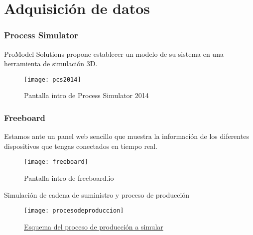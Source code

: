 \documentclass[11pt]{beamer}					%
\begin{document}
\section{Adquisición de datos}
		\begin{frame}
			\frametitle{Process Simulator}			
			\begin{block}{}
				\begin{center}
				ProModel Solutions  propone establecer un modelo de su sistema en una herramienta de simulación 3D.
				\begin{figure}[htb]
		    			\texttt{[image: pcs2014]}
 					\caption{ Pantalla intro de Process Simulator 2014} 
				\end{figure}
				\end{center}
				
			\end{block}
			
	   	\end{frame}
		\begin{frame}
			\frametitle{Freeboard}			
			\begin{block}{Estamos ante un panel web sencillo que muestra la información de los diferentes dispositivos que tengas conectados en tiempo real.}
				\begin{center}
				\begin{figure}[htb]
					\texttt{[image: freeboard]} 
 					\caption{ Pantalla intro de freeboard.io}
				\end{figure}
				\end{center}
				
			\end{block}
			
	   	\end{frame}

		
		\begin{frame}
	    	\begin{block}{Simulación de cadena de suministro y proceso de producción}
				\begin{center}
				\begin{figure}[htb]
       			  		\texttt{[image: procesodeproduccion]}
					\caption{ \href{https://youtu.be/TfvSbhoqySw}{Esquema del proceso de producción a simular}} \label{fig:procesodeproduccion}
				\end{figure}
       				\end{center}
		   	\end{block}
		\end{frame}
\end{document}
